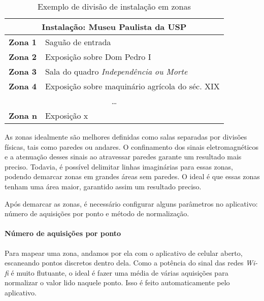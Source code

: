 \begin{table}[htb]
\centering
\caption{Exemplo de divisão de instalação em zonas}
\label{my-label}
\begin{tabular}{|l|l|l|l|l|}
\hline
\multicolumn{5}{|c|}{\textbf{Instalação: Museu Paulista da USP}}             \\ \hline
\multicolumn{2}{|l|}{\textbf{Zona 1}} & \multicolumn{3}{l|}{Saguão de entrada}          \\ \hline
\multicolumn{2}{|l|}{\textbf{Zona 2}} & \multicolumn{3}{l|}{Exposição sobre Dom Pedro I}          \\ \hline
\multicolumn{2}{|l|}{\textbf{Zona 3}} & \multicolumn{3}{l|}{Sala do quadro \textit{Independência ou Morte}}          \\ \hline
\multicolumn{2}{|l|}{\textbf{Zona 4}} & \multicolumn{3}{l|}{Exposição sobre maquinário agrícola do séc. XIX}          \\ \hline
\multicolumn{5}{|c|}{\ldots}                                                    \\ \hline
\multicolumn{2}{|l|}{\textbf{Zona n}} & \multicolumn{3}{l|}{Exposição x}     \\ \hline
\end{tabular}
\end{table}

As zonas idealmente são melhores definidas como salas separadas por divisões físicas, tais como paredes ou andares. O confinamento dos sinais eletromagnéticos e a atenuação desses sinais ao atravessar paredes garante um resultado mais preciso. Todavia, é possível delimitar linhas imaginárias para essas zonas, podendo demarcar zonas em grandes áreas sem paredes. O ideal é que essas zonas tenham uma área maior, garantido assim um resultado preciso.
\par
Após demarcar as zonas, é necessário configurar alguns parâmetros no aplicativo: número de aquisições por ponto e método de normalização.

\paragraph{Número de aquisições por ponto\\}
Para mapear uma zona, andamos por ela com o aplicativo de celular aberto, escaneando pontos discretos dentro dela. Como a potência do sinal das redes \textit{Wi-fi} é muito flutuante, o ideal é fazer uma média de várias aquisições para normalizar o valor lido naquele ponto. Isso é feito automaticamente pelo aplicativo.

